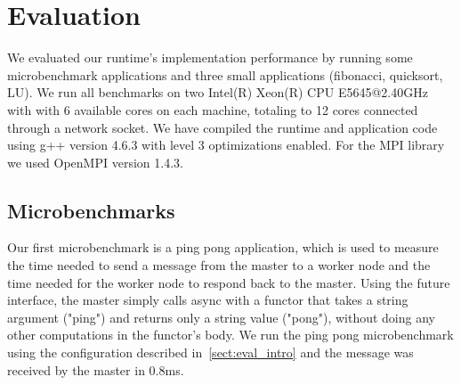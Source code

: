 \chapter{Evaluation}
\label{chap:evaluation}
\label{sect:eval_intro}
	We evaluated our runtime's implementation performance by running some microbenchmark applications and
three small applications (fibonacci, quicksort, LU).  We run all benchmarks on two Intel(R) Xeon(R) 
CPU E5645@2.40GHz with with 6 available cores on each machine, totaling to 12 cores connected through 
a network socket. We have compiled the runtime and application code using g++ version 4.6.3 with 
level 3 optimizations enabled.  For the MPI library we used OpenMPI version 1.4.3.

\section{Microbenchmarks}
\label{sect:microbenchmark}
	Our first microbenchmark is a ping pong application, which is used to measure the time needed to send a 
message from the master to a worker node and the time needed for the worker node to respond back to the master.
Using the future interface, the master simply calls async with a functor that takes a string argument ("ping") 
and returns only a string value ("pong"), without doing any other computations in the functor's body.  We run
the ping pong microbenchmark using the configuration described in~\ref{sect:eval_intro} and the message was 
received by the master in 0.8ms.


